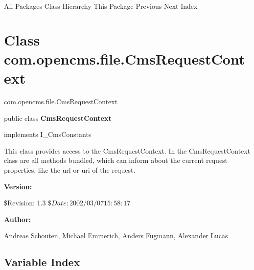 \begin{PRE}
All Packages  Class Hierarchy  This Package  Previous  Next  Index
\end{PRE}

\htmlHR

\section*{  Class com.opencms.file.CmsRequestContext }

\begin{PRE}
com.opencms.file.CmsRequestContext
\end{PRE}

\htmlHR

\begin{description}
\item public class {\bf CmsRequestContext}  
\item implements I\_CmsConstants 
\end{description}

This class provides access to the CmsRequestContext. \htmlBR
In the CmsRequestContext class are all methods bundled, which can inform about
the current request properties, like the url or uri of the request. 

\begin{description}
\item {\bf Version:}  

\$Revision: 1.3 $ \$Date: 2002/03/07 15:58:17 $  
\item {\bf Author:}  

Andreas Schouten, Michael Emmerich, Anders Fugmann, Alexander Lucas 
\end{description}

\htmlHR

\subsection*{  Variable Index }

